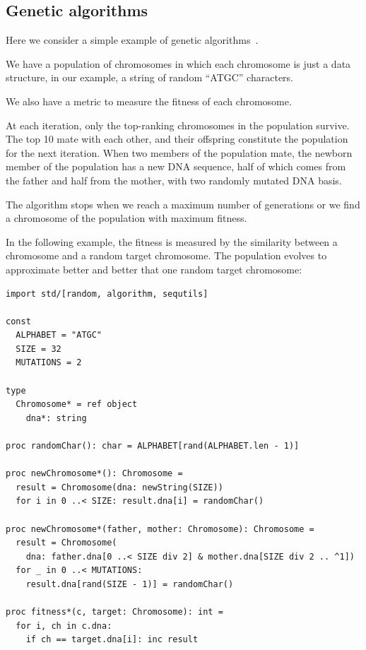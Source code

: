 \documentclass[justified, sixbynine]{tufte-book}
\def\ft{\small\tt}
\theoremstyle{plain}%
\newtheorem * {corollary}{Corollary}
\theoremstyle{definition}
\theoremstyle{remark}
\newtheorem * {remark}{Remark}
\newtheorem * {note}{Note}
\begin{document}
\begin{fullwidth}
\goodbreak\subsection{Genetic algorithms}


Here we consider a simple example of genetic algorithms~\cite{barricelli}.

We have a population of chromosomes in which each chromosome is just a data structure, in our example, a string of random ``ATGC'' characters.

We also have a metric to measure the fitness of each chromosome.

At each iteration, only the top-ranking chromosomes in the population survive. The top 10 mate with each other, and their offspring constitute the population for the next iteration. When two members of the population mate, the newborn member of the population has a new DNA sequence, half of which comes from the father and half from the mother, with two randomly mutated DNA basis.

The algorithm stops when we reach a maximum number of generations or we find a chromosome of the population with maximum fitness.

In the following example, the fitness is measured by the similarity between a chromosome and a random target chromosome. The population evolves to approximate better and better that one random target chromosome:


\begin{lstlisting}[caption={in file: {\ft genetic.nim}}]
import std/[random, algorithm, sequtils]

const
  ALPHABET = "ATGC"
  SIZE = 32
  MUTATIONS = 2

type
  Chromosome* = ref object
    dna*: string

proc randomChar(): char = ALPHABET[rand(ALPHABET.len - 1)]

proc newChromosome*(): Chromosome =
  result = Chromosome(dna: newString(SIZE))
  for i in 0 ..< SIZE: result.dna[i] = randomChar()

proc newChromosome*(father, mother: Chromosome): Chromosome =
  result = Chromosome(
    dna: father.dna[0 ..< SIZE div 2] & mother.dna[SIZE div 2 .. ^1])
  for _ in 0 ..< MUTATIONS:
    result.dna[rand(SIZE - 1)] = randomChar()

proc fitness*(c, target: Chromosome): int =
  for i, ch in c.dna:
    if ch == target.dna[i]: inc result


\end{lstlisting}
\end{fullwidth}
\end{document}
